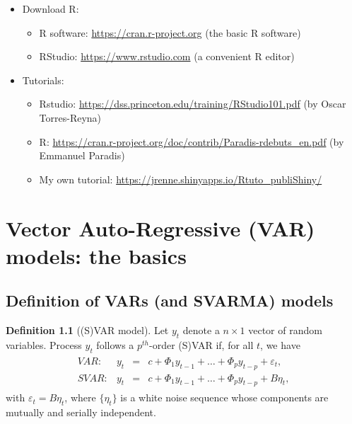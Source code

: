 \documentclass[
  12pt,
]{book}
\providecommand{\tightlist}{%
  \setlength{\itemsep}{0pt}\setlength{\parskip}{0pt}}
\theoremstyle{definition}
\newtheorem{definition}{Definition}[chapter]
\theoremstyle{definition}
\theoremstyle{definition}
\theoremstyle{definition}
\theoremstyle{remark}
\begin{document}
\begin{itemize}
\item
  Download R:

  \begin{itemize}
  \tightlist
  \item
    R software: \url{https://cran.r-project.org} (the basic R software)
  \item
    RStudio: \url{https://www.rstudio.com} (a convenient R editor)
  \end{itemize}
\item
  Tutorials:

  \begin{itemize}
  \tightlist
  \item
    Rstudio: \url{https://dss.princeton.edu/training/RStudio101.pdf} (by Oscar Torres-Reyna)
  \item
    R: \url{https://cran.r-project.org/doc/contrib/Paradis-rdebuts_en.pdf} (by Emmanuel Paradis)
  \item
    My own tutorial: \url{https://jrenne.shinyapps.io/Rtuto_publiShiny/}
  \end{itemize}
\end{itemize}

\hypertarget{basics}{%
\chapter{Vector Auto-Regressive (VAR) models: the basics}\label{basics}}

\hypertarget{definition-of-vars-and-svarma-models}{%
\section{Definition of VARs (and SVARMA) models}\label{definition-of-vars-and-svarma-models}}

\begin{definition}[(S)VAR model]
\protect\hypertarget{def:SVAR}{}\label{def:SVAR}Let \(y_{t}\) denote a \(n \times1\) vector of random variables. Process \(y_{t}\) follows a \(p^{th}\)-order (S)VAR if, for all \(t\), we have
\begin{eqnarray}
\begin{array}{rllll}
VAR:& y_t &=& c + \Phi_1 y_{t-1} + \dots + \Phi_p y_{t-p} + \varepsilon_t,\\
SVAR:& y_t &=& c + \Phi_1 y_{t-1} + \dots + \Phi_p y_{t-p} + B \eta_t,
\end{array}\label{eq:yVAR}
\end{eqnarray}
with \(\varepsilon_t = B\eta_t\), where \(\{\eta_{t}\}\) is a white noise sequence whose components are mutually and serially independent.
\end{definition}
\end{document}
